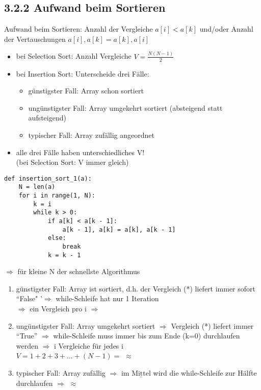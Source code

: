     \subsection*{3.2.2 Aufwand beim Sortieren}
    Aufwand beim Sortieren: Anzahl der Vergleiche $a[i] < a[k]$ und/oder Anzahl der Vertauschungen $a[i],a[k] = a[k], a[i]$

    \begin{itemize}
        \item bei Selection Sort: Anzahl Vergleiche $V = \frac{N(N-1)}{2}$
        \item bei Insertion Sort: Unterscheide drei Fälle:
        \begin{itemize}
            \item günstigster Fall: Array schon sortiert
            \item ungünstigster Fall: Array umgekehrt sortiert (absteigend statt aufsteigend)
            \item typischer Fall: Array zufällig angeordnet
        \end{itemize}
        \item alle drei Fälle haben unterschiedliches V! \\
        (bei Selection Sort: V immer gleich)

    \end{itemize}

    \begin{verbatim}
def insertion_sort_1(a):
    N = len(a)
    for i in range(1, N):
        k = i
        while k > 0:
            if a[k] < a[k - 1]:
                a[k - 1], a[k] = a[k], a[k - 1]
            else:
                break
            k = k - 1
    \end{verbatim}

    $\Rightarrow$ für kleine N der schnellste Algorithmus \\
    \vspace*{-5mm}
    \begin{enumerate}
        \item günstigster Fall: Array ist sortiert, d.h. der Vergleich (*) liefert immer sofort ``False" '$\Rightarrow$ while-Schleife hat nur 1 Iteration \\
        $\Rightarrow$ ein Vergleich pro i $\Rightarrow$
        \item ungünstigster Fall: Array umgekehrt sortiert $\Rightarrow$ Vergleich (*) liefert immer ``True'' $\Rightarrow$ while-Schleife muss immer bis zum Ende (k=0) durchlaufen werden $\Rightarrow$ i Vergleiche für jedes i \\
        $V=1+2+3+...+(N-1)=$  $\approx$ 
        \item typischer Fall: Array zufällig $\Rightarrow$ im $\underline{\text{Mittel}}$ wird die while-Schleife zur Hälfte durchlaufen $\Rightarrow$  $\approx$ 
    \end{enumerate}


